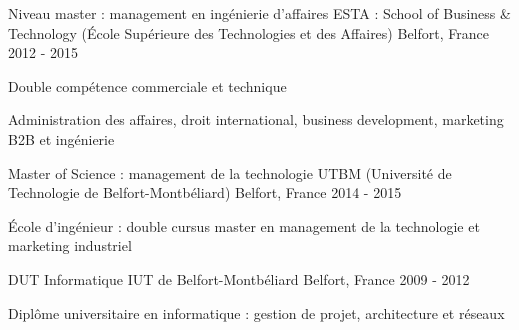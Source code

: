 

\begin{cventries}
    
  \cventry
	{Niveau master : management en ingénierie d'affaires} %
	{ESTA : School of Business \& Technology (École Supérieure des Technologies et des Affaires)} %
	{Belfort, France} %
	{2012 - 2015} %
	{
	   	\begin{cvitems} %
	   		\item {Double compétence commerciale et technique}
	   		\item {Administration des affaires, droit international, business development, marketing B2B et ingénierie}
	  	\end{cvitems}
	}
	
  \cventry
    {Master of Science : management de la technologie} %
    {UTBM (Université de Technologie de Belfort-Montbéliard)} %
    {Belfort, France} %
    {2014 - 2015} %
    {
      \begin{cvitems} %
        \item {École d'ingénieur : double cursus master en management de la technologie et marketing industriel}
      \end{cvitems}
    }

  \cventry
    {DUT Informatique} %
    {IUT de Belfort-Montbéliard} %
    {Belfort, France} %
    {2009 - 2012} %
    {
      \begin{cvitems} %
        \item {Diplôme universitaire en informatique : gestion de projet, architecture et réseaux}
      \end{cvitems}
    }

\end{cventries}
